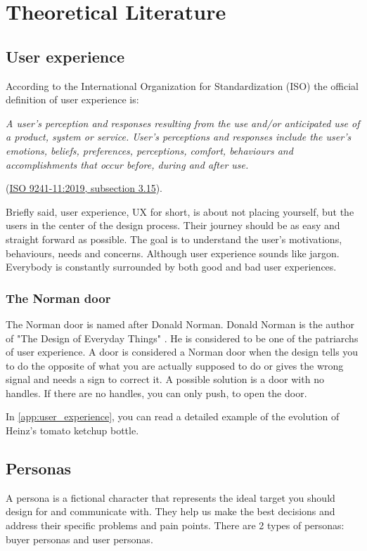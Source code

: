 \chapter{Theoretical Literature}\label{chap:theoretical-literature}

\section{User experience}
According to the International Organization for Standardization (ISO) the official definition of user experience is:  \begin{displayquote} \textit{A user's perception and responses resulting from the use and/or anticipated use of a product, system or service.
    User's perceptions and responses include the user's emotions, beliefs, preferences, perceptions, comfort, behaviours and accomplishments that occur before, during and after use.}

    (\href{https://www.iso.org/obp/ui/#iso:std:iso:9241:-210:ed-2:v1:en}{ISO 9241-11:2019, subsection 3.15}).
\end{displayquote}

Briefly said, user experience, UX for short, is about not placing yourself, but the users in the center of the design process. Their journey should be as easy and straight forward as possible. The goal is to understand the user's motivations, behaviours, needs and concerns. Although user experience sounds like jargon. Everybody is constantly surrounded by both good and bad user experiences.

\subsection{The Norman door}
The Norman door is named after Donald Norman. Donald Norman is the author of "The Design of Everyday Things" \cite{Norman2013}. He is considered to be one of the patriarchs of user experience. A door is considered a Norman door when the design tells you to do the opposite of what you are actually supposed to do or gives the wrong signal and needs a sign to correct it.
A possible solution is a door with no handles. If there are no handles, you can only push, to open the door.

In \autoref{app:user_experience}, you can read a detailed example of the evolution of Heinz's tomato ketchup bottle.

\section{Personas}
    A persona is a fictional character that represents the ideal target you should design for and communicate with. They help us make the best decisions and address their specific problems and pain points. There are 2 types of personas: buyer personas and user personas. 
    
